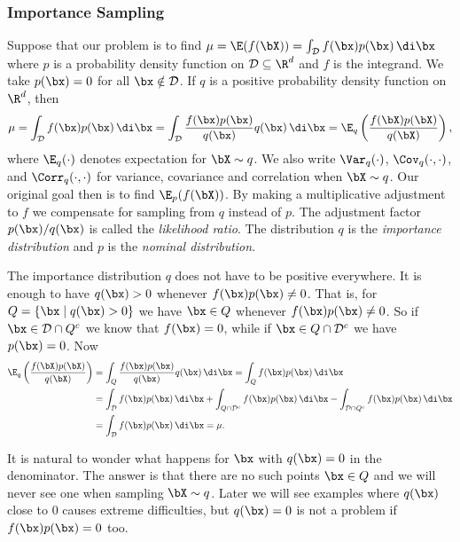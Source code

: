\subsubsection{Importance Sampling}
Suppose that our problem is to find $\mu = \E(f(\bX)) = \int_{\mathcal{D}} f(\bx)p(\bx) \, \di \bx$ where $p$ is a probability density function on $\mathcal{D} \subseteq \R^d$ and $f$ is the integrand. We take $p(\bx) = 0$ for all $\bx \notin \mathcal{D}$. If $q$ is a positive probability density function on $\R^d$, then
\begin{equation}
	\mu = \int_{\mathcal{D}} f(\bx)p(\bx) \, \di \bx = \int_{\mathcal{D}} \frac{f(\bx)p(\bx)}{q(\bx)} q(\bx) \, \di \bx = \E_q \left( \frac{f(\bX)p(\bX)}{q(\bX)} \right),
	\label{eq:ImportanceSamplingIdentity}
\end{equation}
where $\E_q(\cdot)$ denotes expectation for $\bX \sim q$. We also write $\Var_q(\cdot)$, $\Cov_q(\cdot, \cdot)$, and $\Corr_q(\cdot, \cdot)$ for variance, covariance and correlation when $\bX \sim q$. Our original goal then is to find $\E_p(f(\bX))$. By making a multiplicative adjustment to $f$ we compensate for sampling from $q$ instead of $p$. The adjustment factor $p(\bx)/q(\bx)$ is called the \textit{likelihood ratio}. The distribution $q$ is the \textit{importance distribution} and $p$ is the \textit{nominal distribution}.

The importance distribution $q$ does not have to be positive everywhere. It is enough to have $q(\bx) > 0$ whenever $f(\bx)p(\bx) \neq 0$. That is, for $Q = \{ \bx \mid q(\bx) > 0 \}$ we have $\bx \in Q$ whenever $f(\bx)p(\bx) \neq 0$. So if $\bx \in \mathcal{D} \cap Q^c$ we know that $f(\bx) = 0$, while if $\bx \in Q \cap \mathcal{D}^c$ we have $p(\bx) = 0$. Now
\begin{align}
	\E_q \left( \frac{f(\bX)p(\bX)}{q(\bX)} \right) & = \int_Q \frac{f(\bx)p(\bx)}{q(\bx)} q(\bx) \, \di \bx = \int_Q f(\bx)p(\bx) \, \di \bx \nonumber                                                                  \\
	                                                & = \int_{\mathcal{D}} f(\bx)p(\bx) \, \di \bx + \int_{Q \cap \mathcal{D}^c} f(\bx)p(\bx) \, \di \bx - \int_{\mathcal{D} \cap Q^c} f(\bx)p(\bx) \, \di \bx \nonumber \\
	                                                & = \int_{\mathcal{D}} f(\bx)p(\bx) \, \di \bx = \mu.
	\label{eq:ImportanceSamplingDerivation}
\end{align}

It is natural to wonder what happens for $\bx$ with $q(\bx) = 0$ in the denominator. The answer is that there are no such points $\bx \in Q$ and we will never see one when sampling $\bX \sim q$. Later we will see examples where $q(\bx)$ close to $0$ causes extreme difficulties, but $q(\bx) = 0$ is not a problem if $f(\bx)p(\bx) = 0$ too.

